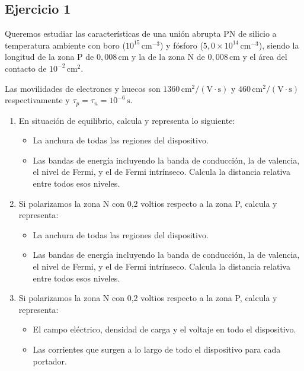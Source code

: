 
\subsection{Ejercicio 1}

Queremos estudiar las características de una unión abrupta PN de silicio a temperatura ambiente con boro (\(10^{15} \, \text{cm}^{-3}\)) y fósforo (\(5,0 \times 10^{14} \, \text{cm}^{-3}\)), siendo la longitud de la zona P de \(0,008 \, \text{cm}\) y la de la zona N de \(0,008 \, \text{cm}\) y el área del contacto de \(10^{-2} \, \text{cm}^2\). 

Las movilidades de electrones y huecos son \(1360 \, \text{cm}^2/(\text{V}\cdot\text{s})\) y \(460 \, \text{cm}^2/(\text{V}\cdot\text{s})\) respectivamente y \(\tau_p = \tau_n = 10^{-6} \, \text{s}\).

\begin{enumerate}[label=\alph*)]
\item En situación de equilibrio, calcula y representa lo siguiente:
\begin{itemize}
    \item La anchura de todas las regiones del dispositivo.
    \item Las bandas de energía incluyendo la banda de conducción, la de valencia, el nivel de Fermi, y el de Fermi intrínseco. Calcula la distancia relativa entre todos esos niveles.
\end{itemize}

\item Si polarizamos la zona N con 0,2 voltios respecto a la zona P, calcula y representa:
\begin{itemize}
    \item La anchura de todas las regiones del dispositivo.
    \item Las bandas de energía incluyendo la banda de conducción, la de valencia, el nivel de Fermi, y el de Fermi intrínseco. Calcula la distancia relativa entre todos esos niveles.
\end{itemize}

\item Si polarizamos la zona N con 0,2 voltios respecto a la zona P, calcula y representa:
\begin{itemize}
    \item El campo eléctrico, densidad de carga y el voltaje en todo el dispositivo.
    \item Las corrientes que surgen a lo largo de todo el dispositivo para cada portador.
\end{itemize}
\end{enumerate}


